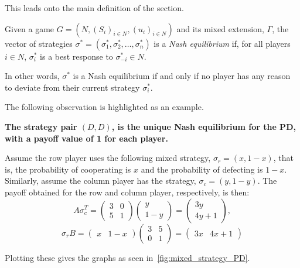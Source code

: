 This leads onto the main definition of the section.
\begin{definition}
    Given a game \(G=(N, {(S_{i})}_{i \in N}, {(u_{i})}_{i \in N})\) and its
    mixed extension, \(\Gamma \), the vector of
    strategies \(\sigma^{*} = (\sigma_{1}^{*}, \sigma_{2}^{*}, \ldots, \sigma_{n}^{*})\) is a
    \textit{Nash equilibrium} if, for all players \(i \in N\), \(\sigma_{i}^{*}\) is 
    a best response to \(\sigma_{-i}^{*} \in N\).
\end{definition}\label{def:NE}

In other words, \(\sigma^{*}\) is a Nash equilibrium if and only if no player has any
reason to deviate from their current strategy \(\sigma_{i}^{*}\).

The following observation is highlighted as an example.

\begin{center}
    \textbf{The strategy pair \((D, D)\), is the unique Nash equilibrium 
    for the PD, with a payoff value of 1 for each player.}
\end{center}

Assume the row player uses the following mixed strategy, \(\sigma_{r} = (x,
1-x)\), that is, the probability of cooperating is \(x\) and the probability of
defecting is \(1-x\). Similarly, assume the column player has 
the strategy, \(\sigma_{c} = (y, 1-y)\). The payoff obtained for the row and column player, respectively, is then:
\[
    A\sigma_{c}^T = \begin{pmatrix}
        3 & 0 \\
        5 & 1
    \end{pmatrix} \begin{pmatrix}
        y \\
        1-y
    \end{pmatrix} = \begin{pmatrix}
        3y \\
        4y + 1
    \end{pmatrix},
\]
\[
    \sigma_{r}B = \begin{pmatrix}
        x & 1-x
    \end{pmatrix} \begin{pmatrix}
        3 & 5 \\
        0 & 1        
    \end{pmatrix}  = \begin{pmatrix}
        3x & 4x + 1
    \end{pmatrix}
\]

Plotting these gives the graphs as seen in~\autoref{fig:mixed_strategy_PD}.

